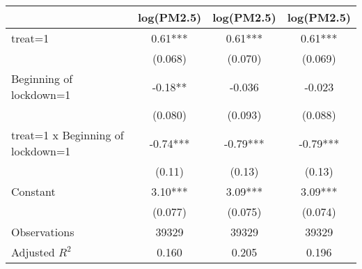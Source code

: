 {
\def\sym#1{\ifmmode^{#1}\else\(^{#1}\)\fi}
\begin{tabular}{l*{3}{c}}
\hline\hline
                    &\multicolumn{1}{c}{log(PM2.5)}&\multicolumn{1}{c}{log(PM2.5)}&\multicolumn{1}{c}{log(PM2.5)}\\
\hline
treat=1             &        0.61***&        0.61***&        0.61***\\
                    &     (0.068)   &     (0.070)   &     (0.069)   \\
[1em]
Beginning of lockdown=1&       -0.18** &      -0.036   &      -0.023   \\
                    &     (0.080)   &     (0.093)   &     (0.088)   \\
[1em]
treat=1 x Beginning of lockdown=1&       -0.74***&       -0.79***&       -0.79***\\
                    &      (0.11)   &      (0.13)   &      (0.13)   \\
[1em]
Constant            &        3.10***&        3.09***&        3.09***\\
                    &     (0.077)   &     (0.075)   &     (0.074)   \\
\hline
Observations        &       39329   &       39329   &       39329   \\
Adjusted \(R^{2}\)  &       0.160   &       0.205   &       0.196   \\
\hline\hline
\end{tabular}
}

